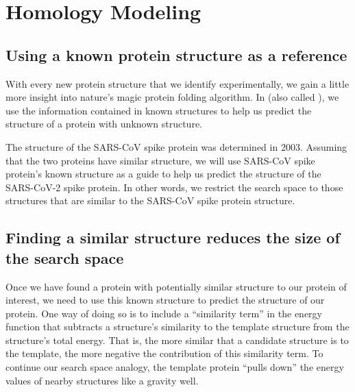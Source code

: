 \section{Homology Modeling}
\label{sec:homology}
\subsection{Using a known protein structure as a reference}

With every new protein structure that we identify experimentally, we gain a little more insight into nature's magic protein folding algorithm. In  (also called ), we use the information contained in known structures to help us predict the structure of a protein with unknown structure.

The structure of the SARS-CoV spike protein was determined in 2003. Assuming that the two proteins have similar structure, we will use SARS-CoV spike protein's known structure as a guide to help us predict the structure of the SARS-CoV-2 spike protein. In other words, we restrict the search space to those structures that are similar to the SARS-CoV spike protein structure.\\

\begin{qbox}\end{qbox}

\subsection{Finding a similar structure reduces the size of the search space}

Once we have found a protein with potentially similar structure to our protein of interest, we need to use this known structure to predict the structure of our protein. One way of doing so is to include a ``similarity term'' in the energy function that subtracts a structure's similarity to the template structure from the structure's total energy. That is, the more similar that a candidate structure is to the template, the more negative the contribution of this similarity term. To continue our search space analogy, the template protein ``pulls down'' the energy values of nearby structures like a gravity well.

